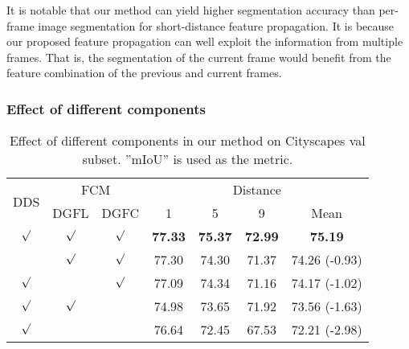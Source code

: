 \documentclass[journal]{IEEEtran}
\begin{document}
It is notable that our method can yield higher segmentation accuracy than per-frame image segmentation for short-distance feature propagation. It is because our proposed feature propagation can well exploit the information from multiple frames. That is, the segmentation of the current frame would benefit from the feature combination of the previous and current frames. 

\subsubsection{Effect of different components}

\begin{table}[t]
	\caption{Effect of different components in our method on Cityscapes val subset. ''mIoU'' is used as the metric.}
	\begin{center}
		\renewcommand{\arraystretch}{1.3}
		\begin{tabular}{c|c|c|c|c|c|c}
			\hline
			\multirow{2}{*}{DDS} & \multicolumn{2}{c|}{FCM} & \multicolumn{4}{c}{Distance} 							\\
			\cline{2-7}
			& DGFL		& DGFC      & 1			& 5				& 9 			& Mean   	 						\\
			\hline
			$\surd$ 	& $\surd$	& $\surd$	& \bf{77.33}	& \bf{75.37}	& \bf{72.99}	& \bf{75.19} 		\\
			& $\surd$	& $\surd$	& 77.30		& 74.30			& 71.37			& 74.26	(-0.93)						\\
			$\surd$ 	& 			& $\surd$	& 77.09			& 74.34			& 71.16			& 74.17	(-1.02)		\\
			$\surd$ 	& $\surd$	& 			& 74.98			& 73.65			& 71.92			& 73.56	(-1.63)		\\
			$\surd$ 	& 			& 			& 76.64			& 72.45 		& 67.53 		& 72.21	(-2.98)		\\
			\hline
		\end{tabular}
	\end{center}
	\label{exp_distortion}
\end{table}
\end{document}
